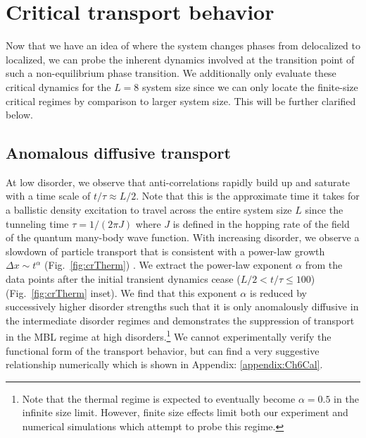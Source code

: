 \section{Critical transport behavior}

Now that we have an idea of where the system changes phases from delocalized to localized, we can probe the inherent dynamics involved at the transition point of such a non-equilibrium phase transition. We additionally only evaluate these critical dynamics for the $L=8$ system size since we can only locate the finite-size critical regimes by comparison to larger system size. This will be further clarified below.


\subsection{Anomalous diffusive transport}

At low disorder, we observe that anti-correlations rapidly build up and saturate with a time scale of $t/\tau \approx L/2$. Note that this is the approximate time it takes for a ballistic density excitation to travel across the entire system size $L$ since the tunneling time $\tau = 1/(2\pi J)$  where $J$ is defined in the hopping rate of the field of the quantum many-body wave function. With increasing disorder, we observe a slowdown of particle transport that is consistent with a power-law growth $\Delta x \sim t^\alpha$ (Fig.~\ref{fig:crTherm}) \cite{Agarwal2015,Setiawan2017,Zhang2018,Garrison2018}. We extract the power-law exponent $\alpha$ from the data points after the initial transient dynamics cease ($L/2 < t/\tau \leq 100$) (Fig.~\ref{fig:crTherm} inset). We find that this exponent $\alpha$ is reduced by successively higher disorder strengths such that it is only anomalously diffusive in the intermediate disorder regimes and demonstrates the suppression of transport in the MBL regime at high disorders.\footnote{Note that the thermal regime is expected to eventually become $\alpha=0.5$ in the infinite size limit. However, finite size effects limit both our experiment and numerical simulations which attempt to probe this regime.\cite{Agarwal2015}} We cannot experimentally verify the functional form of the transport behavior, but can find a very suggestive relationship numerically which is shown in Appendix: \ref{appendix:Ch6Cal}. 

